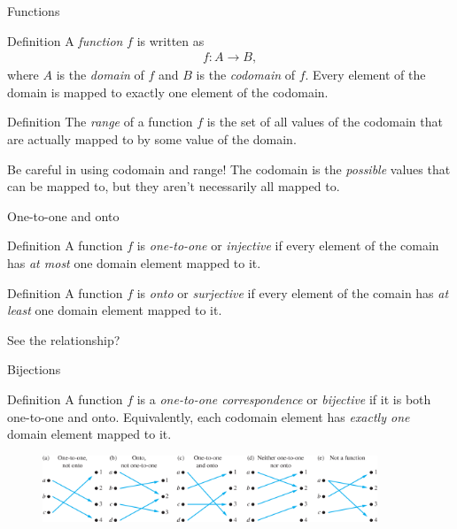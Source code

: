 \documentclass[dvipsnames,t]{beamer}
\begin{document}
\begin{frame}{Functions}
\begin{block}{Definition}
	A \textit{function} $f$ is written as
	\begin{align*}
	f\colon A \rightarrow B,
	\end{align*}
	where $A$ is the \textit{domain} of $f$ and $B$ is the \textit{codomain} of $f$. Every element of the domain is mapped to exactly one element of the codomain.
\end{block}
\begin{block}{Definition}
	The \textit{range} of a function $f$ is the set of all values of the codomain that are actually mapped to by some value of the domain.
\end{block}
Be careful in using codomain and range! The codomain is the \textit{possible} values that can be mapped to, but they aren't necessarily all mapped to.
\end{frame}

\begin{frame}{One-to-one and onto}
\begin{block}{Definition}
	A function $f$ is \textit{one-to-one} or \textit{injective} if every element of the comain has \textit{at most} one domain element mapped to it.
\end{block}
\begin{block}{Definition}
	A function $f$ is \textit{onto} or \textit{surjective} if every element of the comain has \textit{at least} one domain element mapped to it.
\end{block}
See the relationship?
\end{frame}

\begin{frame}{Bijections}
\begin{block}{Definition}
	A function $f$ is a \textit{one-to-one correspondence} or \textit{bijective} if it is both one-to-one and onto. Equivalently, each codomain element has \textit{exactly one} domain element mapped to it.
\end{block}
\begin{figure}[htp]
    \centering
    \includegraphics[width=10cm]{func}
\end{figure}
\end{frame}
\end{document}
